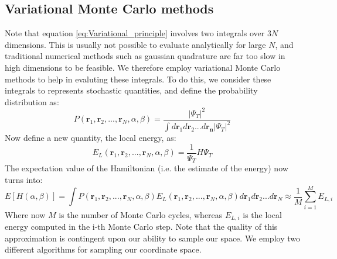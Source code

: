 \documentclass[a4paper, 10pt]{article}
\begin{document}
\subsection{Variational Monte Carlo methods}
Note that equation \ref{eq:Variational_principle} involves two integrals over $3N$ dimensions. This is usually not possible to evaluate analytically for large $N$, and traditional numerical methods such as gaussian quadrature are far too slow in high dimensions to be feasible. We therefore employ variational Monte Carlo methods to help in evaluting these integrals. To do this, we consider these integrals to represents stochastic quantities, and define the probability distribution as:
\begin{equation}
P(\boldsymbol{r}_1, \boldsymbol{r}_2,...,\boldsymbol{r}_N, \alpha,\beta)=\frac{|\Psi_T|^2}{\int d\boldsymbol{r}_1d\boldsymbol{r}_2...d\boldsymbol{r_n}|\Psi_T|^2}
\end{equation}
Now define a new quantity, the local energy, as:
\begin{equation}\label{eq:Local_energy_general_expression}
E_L(\boldsymbol{r}_1, \boldsymbol{r}_2,...,\boldsymbol{r}_N, \alpha,\beta)=\frac{1}{\Psi_T}H\Psi_T
\end{equation}
The	expectation value of the Hamiltonian (i.e. the estimate of the energy) now turns into:
\begin{equation}\label{eq:Expectation_Hamiltonian}
E[H(\alpha, \beta)]=\int P(\boldsymbol{r}_1, \boldsymbol{r}_2,...,\boldsymbol{r}_N, \alpha,\beta)E_L(\boldsymbol{r}_1, \boldsymbol{r}_2,...,\boldsymbol{r}_N, \alpha,\beta)d\boldsymbol{r}_1d\boldsymbol{r}_2...d\boldsymbol{r}_N\approx \frac{1}{M}\sum_{i=1}^M E_{L,i}
\end{equation}
Where now $M$ is the number of Monte Carlo cycles, whereas $E_{L,i}$ is the local energy computed in the i-th Monte Carlo step. Note that the quality of this approximation is contingent upon our ability to sample our space. We employ two different algorithms for sampling our coordinate space.
\end{document}
